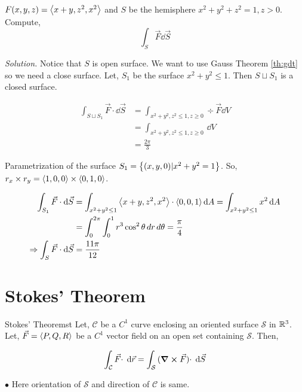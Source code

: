 \documentclass[../Analysis-3.tex]{subfiles}
\begin{document}
\begin{Eg}{}{}
  $F (x,y,z) = \left\langle {x+y}, {z^2,x^2} \right\rangle$ and $S$ be the hemisphere $x^2+y^2+z^2 = 1, z>0$. Compute,
  \[\int_{S} \vec{F} \dd \vec{S}\]

  \textit{Solution.} Notice that $S$ is open surface. We want to  use Gauss Theorem \ref{th:gdt} so we need a close surface. Let, $S_1$ be the surface $x^2 +y^2 \le 1$. Then $S \sqcup S_1$ is a closed surface.

  \begin{align*}
    \int_{S \sqcup S_1} \vec{F}\cdot \dd \vec{S} & = \int_{x^2+y^2,z^2 \le 1, z \ge 0} \div \vec{F} \dd{V} \\
                                                 & = \int_{x^2+y^2,z^2 \le 1, z \ge 0}\,\dd{V}             \\
                                                 & = \frac{2\pi}{3}
  \end{align*}

  Parametrization of the surface $S_1 =\qty{(x,y,0) | x^2+y^2 = 1}$. So, $r_x \times r_y = \left\langle {1,0}, {0} \right\rangle \times \left\langle {0,1}, {0} \right\rangle$.

  \begin{align*}
    \int_{S_1} \vec{F} \cdot \dd \vec{S}           & = \int_{x^2+y^2 \le 1} \left\langle {x+y}, {z^2,x^2} \right\rangle \cdot \left\langle {0,0}, {1} \right\rangle \dd{A} = \int_{x^2+y^2 \le 1} x^2 \dd{A} \\
                                                   & = \int_{0}^{2\pi} \int_{0}^{1} r^3 \cos^2 \theta \,dr \,d\theta = \frac{\pi}{4}                       \\
    \Rightarrow \int_{S} \vec{F} \cdot \dd \vec{S} & = \frac{11\pi}{12}
  \end{align*}
\end{Eg}

\section{Stokes' Theorem}
\begin{Thm}{Stokes' Theorem}{st}
  Let, $\mathcal{C}$ be a $C^1$ curve enclosing an oriented surface $\mathcal{S}$ in $\mathbb{R}^3$. Let,  $\vec{F} = \left\langle {P,Q}, {R} \right\rangle$ be a $C^1$ vector field on an open set containing $\mathcal{S}$. Then,

  \small \[\int_{\mathcal{C}} {\vec{F} \cdot } \hspace{0.1cm} \dd {\vec{r}} = \int_{\mathcal{S}} {(\curl \vec{F}) \cdot} \hspace{0.1cm} \dd {\vec{S}}  \]

  $\bullet$ Here orientation of $\mathcal{S}$ and direction of $\mathcal{C}$ is same.
\end{Thm}
\end{document}
